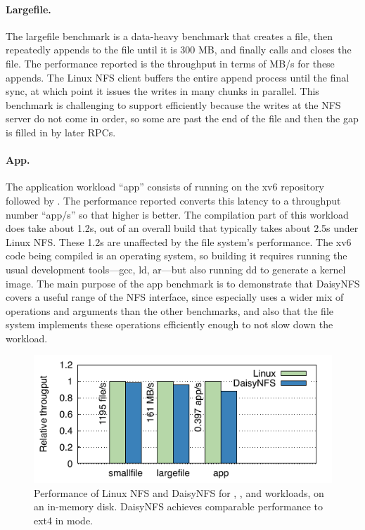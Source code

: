 \paragraph{Largefile.}
The largefile benchmark is a data-heavy benchmark that creates a file, then
repeatedly appends to the file until it is 300 MB, and finally calls
 and closes the file. The performance reported is the throughput in
terms of MB/s for these appends. The Linux NFS client buffers the entire append
process until the final sync, at which point it issues the writes in many chunks
in parallel. This benchmark is challenging to support efficiently because the
writes at the NFS server do not come in order, so some are past the end of the
file and then the gap is filled in by later RPCs.

\paragraph{App.}
The application workload ``app'' consists of running  on the xv6
repository followed by . The performance reported converts this latency
to a throughput number ``app/s'' so that higher is better. The compilation part
of this workload does take about 1.2s, out of an overall build that typically
takes about 2.5s under Linux NFS. These 1.2s are unaffected by the file system's
performance. The xv6 code being compiled is an operating system, so building it
requires running the usual development tools---gcc, ld, ar---but also running dd
to generate a kernel image. The main purpose of the app benchmark is to
demonstrate that DaisyNFS covers a useful range of the NFS interface, since
 especially uses a wider mix of operations and arguments than the
other benchmarks, and also that the file system implements these operations
efficiently enough to not slow down the workload.



\begin{figure}[ht]
  \includegraphics{daisy-nfs/fig/bench.pdf}
  \caption[Performance for smallfile, largefile, and app benchmarks]%
  {Performance of Linux NFS and DaisyNFS for ,
    , and  workloads, on an in-memory disk.
    DaisyNFS achieves comparable performance to ext4 in  mode.}
  \label{fig:eval:bench}
\end{figure}

